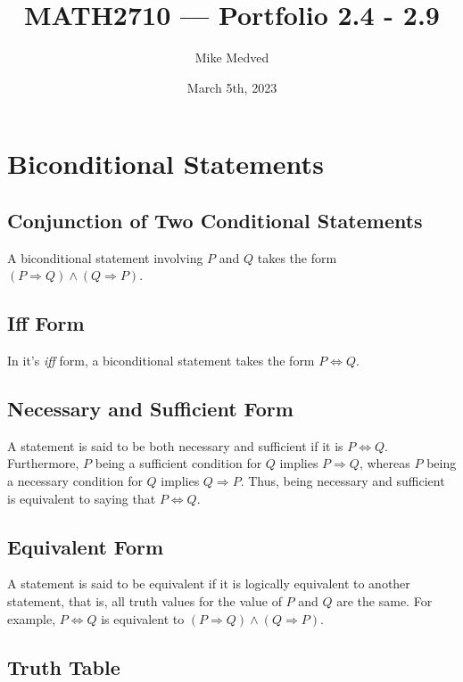 \documentclass{article}
\title{MATH2710 — Portfolio 2.4 - 2.9}
\author{Mike Medved}
\date{March 5th, 2023}
\begin{document}
\maketitle

\section{Biconditional Statements}

\subsection{Conjunction of Two Conditional Statements}

A biconditional statement involving $P$ and $Q$ takes the form $(P \Rightarrow Q) \land (Q \Rightarrow P)$.

\subsection{Iff Form}

In it's \textit{iff} form, a biconditional statement takes the form $P \iff Q$.

\subsection{Necessary and Sufficient Form}

A statement is said to be both necessary and sufficient if it is $P \iff Q$. Furthermore, $P$ being a sufficient condition for $Q$ implies $P \Rightarrow Q$, whereas $P$ being a necessary condition for $Q$ implies $Q \Rightarrow P$. Thus, being necessary and sufficient is equivalent to saying that $P \iff Q$.

\subsection{Equivalent Form}

A statement is said to be equivalent if it is logically equivalent to another statement, that is, all truth values for the value of $P$ and $Q$ are the same. For example, $P \iff Q$ is equivalent to $(P \Rightarrow Q) \land (Q \Rightarrow P)$.

\subsection{Truth Table}
\end{document}
